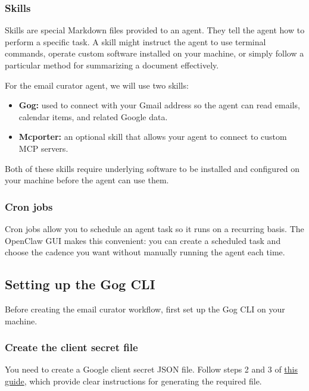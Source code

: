 \documentclass[12pt, a4paper]{article}
\begin{document}
\subsubsection{Skills}

Skills are special Markdown files provided to an agent. They tell the agent how to perform a specific task. A skill might instruct the agent to use terminal commands, operate custom software installed on your machine, or simply follow a particular method for summarizing a document effectively.

For the email curator agent, we will use two skills:

\begin{itemize}[leftmargin=1.5em]
\item \textbf{Gog:} used to connect with your Gmail address so the agent can read emails, calendar items, and related Google data.
\item \textbf{Mcporter:} an optional skill that allows your agent to connect to custom MCP servers.
\end{itemize}

\begin{warnbox}
Both of these skills require underlying software to be installed and configured on your machine before the agent can use them.
\end{warnbox}

\subsubsection{Cron jobs}

Cron jobs allow you to schedule an agent task so it runs on a recurring basis. The OpenClaw GUI makes this convenient: you can create a scheduled task and choose the cadence you want without manually running the agent each time.

\subsection{Setting up the Gog CLI}

Before creating the email curator workflow, first set up the Gog CLI on your machine.

\subsubsection{Create the client secret file}

You need to create a Google client secret JSON file. Follow steps 2 and 3 of \href{https://www.digitalocean.com/community/tutorials/connect-google-to-openclaw}{this guide}, which provide clear instructions for generating the required file.
\end{document}
